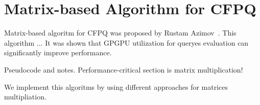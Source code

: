 \section{Matrix-based Algorithm for CFPQ}

Matrix-based algoritm for CFPQ was proposed by Rustam Azimov~\cite{Azimov:2018:CPQ:3210259.3210264}.
This algorithm ...
It was shown that GPGPU utilization for queryes evaluation can significantly improve performance.

Pseudocode and notes. Performance-critical section is matrix multiplication!

We implement this algoritms by using different approaches for matrices multipliation.
